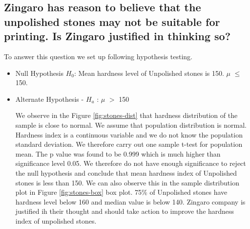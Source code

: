 \documentclass[12pt,a4paper]{style}
\begin{document}
	\subsection{Zingaro has reason to believe that the unpolished stones may not be suitable for printing. Is Zingaro justified in thinking so?}
	To answer this question we set up following hypothesis testing.
	\begin{itemize}
		\item Null Hypothesis $H_0$: Mean hardness level of Unpolished stones is 150. $\mu$ $\leq$150. 
		\item Alternate Hypothesis - $H_a$ : $\mu$ $>$ 150 
		
	We observe in the Figure \ref{fig:stones-dist} that hardness distribution of the sample is close to normal. We assume that population distribution is normal. Hardness index is a continuous variable and we do not know the population standard deviation. We therefore carry out one sample t-test for population mean. The p value was found to be 0.999 which is much higher than significance level 0.05. We therefore do not have enough significance to reject the null hypothesis and conclude that mean hardness index of Unpolished stones is less than 150. We can also observe this in the sample distribution plot in Figure \ref{fig:stones-box} box plot. 75\% of Unpolished stones have hardness level below 160 and median value is below 140. Zingaro company is justified ih their thought and should take action to improve the hardness index of unpolished stones.    
	\end{itemize}
\end{document}

